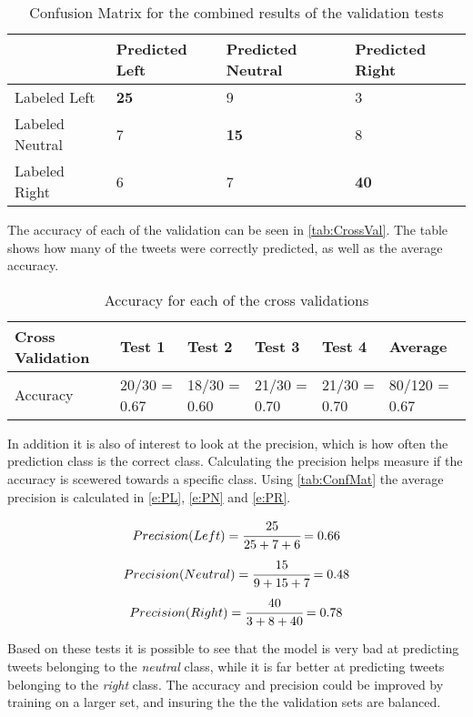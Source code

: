 \begin{table}[H]
\centering
\begin{tabular}{l|l|l|l|}
\cline{2-4}
& Predicted Left & Predicted Neutral & Predicted Right \\ \hline 
\multicolumn{1}{|l|}{Labeled Left} & \textbf{25} & 9 & 3 \\ \hline
\multicolumn{1}{|l|}{Labeled Neutral} & 7 & \textbf{15} & 8  \\ \hline
\multicolumn{1}{|l|}{Labeled Right} & 6 & 7 & \textbf{40} \\ \hline
\end{tabular}
\caption{Confusion Matrix for the combined results of the validation tests}
\label{tab:ConfMat}
\end{table}

The accuracy of each of the validation can be seen in \autoref{tab:CrossVal}.
The table shows how many of the tweets were correctly predicted, as well as
the average accuracy. 

\begin{table}[H]
\centering
\begin{tabular}{|l|l|l|l|l|l|}
\hline
Cross Validation & Test 1 & Test 2 & Test 3 & Test 4 & Average \\ \hline
Accuracy &  20/30 = 0.67 & 18/30 = 0.60 & 21/30 = 0.70 & 21/30 = 0.70 & 80/120 =
0.67 
\\ \hline
\end{tabular}
\caption{Accuracy for each of the cross validations}
\label{tab:CrossVal}
\end{table}

In addition it is also of interest to look at the precision, which is how often
the prediction class is the correct class. Calculating the precision helps
measure if the accuracy is scewered towards a specific class. Using
\autoref{tab:ConfMat} the average precision is calculated in \autoref{e:PL},
\autoref{e:PN} and \autoref{e:PR}.

\begin{equation}\label{e:PL}
Precision(Left) = \cfrac{25}{25+7+6} = 0.66
\end{equation}
\begin{equation}\label{e:PN}
Precision(Neutral) = \cfrac{15}{9+15+7} = 0.48
\end{equation}
\begin{equation}\label{e:PR}
Precision(Right) = \cfrac{40}{3+8+40} = 0.78
\end{equation}

Based on these tests it is possible to see that the model is very bad at
predicting tweets belonging to the \textit{neutral} class, while it is far
better at predicting tweets belonging to the \textit{right} class. The accuracy
and precision could be improved by training on a larger set, and insuring the
the the validation sets are balanced.

